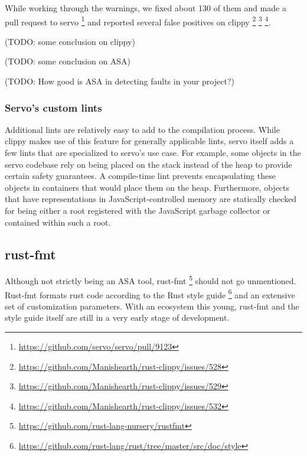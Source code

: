 \documentclass{scrartcl}
\newcommand{\todo}[1] {{\color{red}(TODO: #1)}}
\begin{document}
While working through the warnings, we fixed about 130 of them and made a pull request to servo \footnote{\url{https://github.com/servo/servo/pull/9123}} and reported several false positives on clippy \footnote{\url{https://github.com/Manishearth/rust-clippy/issues/528}} \footnote{\url{https://github.com/Manishearth/rust-clippy/issues/529}} \footnote{\url{https://github.com/Manishearth/rust-clippy/issues/532}}.


\todo{some conclusion on clippy}

\todo{some conclusion on ASA}

\todo{How good is ASA in detecting faults in your project?}


\subsubsection{Servo's custom lints}

Additional lints are relatively easy to add to the compilation process. While clippy makes use of this feature for generally applicable lints, servo itself adds a few lints that are specialized to servo's use case. For example, some objects in the servo codebase rely on being placed on the stack instead of the heap to provide certain safety guarantees. A compile-time lint prevents encapsulating these objects in containers that would place them on the heap. Furthermore, objects that have representations in JavaScript-controlled memory are statically checked for being either a root registered with the JavaScript garbage collector or contained within such a root.

\subsection{rust-fmt}
Although not strictly being an ASA tool, rust-fmt \footnote{\url{https://github.com/rust-lang-nursery/rustfmt}} should not go unmentioned. Rust-fmt formats rust code according to the Rust style guide \footnote{\url{https://github.com/rust-lang/rust/tree/master/src/doc/style}} and an extensive set of customization parameters. With an ecosystem this young, rust-fmt and the style guide itself are still in a very early stage of development.
\end{document}
